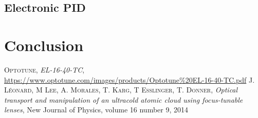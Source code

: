\documentclass[a4paper,10pt]{article}
\begin{document}
\subsection{Electronic PID}

\section{Conclusion}

 \begin{thebibliography}{99}
 \textsc{Optotune}, \textit{EL-16-40-TC}, \url{https://www.optotune.com/images/products/Optotune%20EL-16-40-TC.pdf}
%
 \textsc{J. Léonard, M Lee, A. Morales, T. Karg, T Esslinger, T. Donner}, \textit{Optical transport and manipulation of an ultracold atomic cloud using focus-tunable lenses}, New Journal of Physics, volume 16 number 9, 2014

%
%
%
%
%
 \end{thebibliography}
\end{document}
